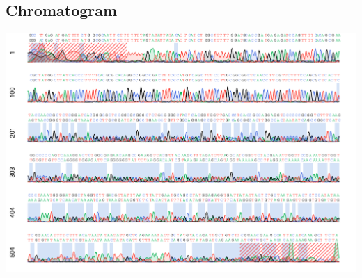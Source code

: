 \documentclass[UTF8,a4paper,landscape]{ctexart}\usepackage[]{graphicx}\usepackage[]{color}
\makeatletter
\def\maxwidth{ %
  \ifdim\Gin@nat@width>\linewidth
    \linewidth
  \else
    \Gin@nat@width
  \fi
}
\newenvironment{knitrout}{}{} %
\makeatother
\begin{document}
\subsection*{Chromatogram}
\begin{knitrout}
\color{fgcolor}
\includegraphics[width=\maxwidth]{figure/chromatogram-1} 

\end{knitrout}

\newpage
\end{document}
